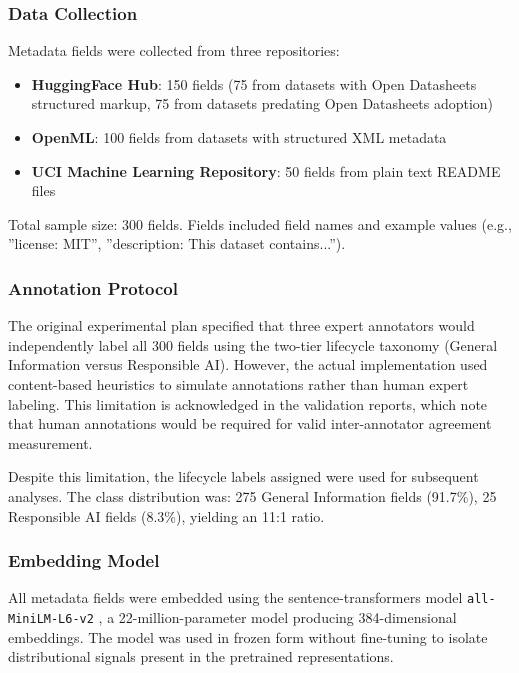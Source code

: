 
\subsubsection{Data Collection}

Metadata fields were collected from three repositories:

\begin{itemize}
\item \textbf{HuggingFace Hub}: 150 fields (75 from datasets with Open Datasheets structured markup, 75 from datasets predating Open Datasheets adoption)
\item \textbf{OpenML}: 100 fields from datasets with structured XML metadata
\item \textbf{UCI Machine Learning Repository}: 50 fields from plain text README files
\end{itemize}

Total sample size: 300 fields. Fields included field names and example values (e.g., ''license: MIT'', ''description: This dataset contains...'').

\subsubsection{Annotation Protocol}

The original experimental plan specified that three expert annotators would independently label all 300 fields using the two-tier lifecycle taxonomy (General Information versus Responsible AI). However, the actual implementation used content-based heuristics to simulate annotations rather than human expert labeling. This limitation is acknowledged in the validation reports, which note that human annotations would be required for valid inter-annotator agreement measurement.

Despite this limitation, the lifecycle labels assigned were used for subsequent analyses. The class distribution was: 275 General Information fields (91.7\%), 25 Responsible AI fields (8.3\%), yielding an 11:1 ratio.

\subsubsection{Embedding Model}

All metadata fields were embedded using the sentence-transformers model \texttt{all-MiniLM-L6-v2} \citep{Reimers2019}, a 22-million-parameter model producing 384-dimensional embeddings. The model was used in frozen form without fine-tuning to isolate distributional signals present in the pretrained representations.

